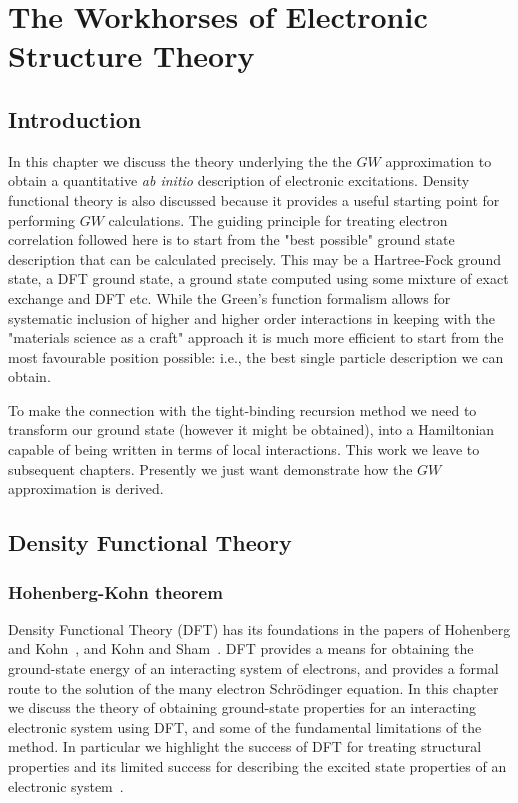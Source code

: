 \chapter{The Workhorses of Electronic Structure Theory}
\label{chap:gw}
\noindent
\section{Introduction}
In this chapter we discuss the theory underlying the 
the $GW$ approximation to obtain a quantitative {\it ab initio} 
description of electronic excitations. Density functional theory
is also discussed because it provides a useful starting point for
performing $GW$ calculations. The guiding principle for treating electron 
correlation followed here is to start from the "best possible" ground state description
that can be calculated precisely. This may be a Hartree-Fock ground state,
a DFT ground state, a ground state computed using some mixture of exact exchange
and DFT etc. While the Green's function formalism allows for systematic
inclusion of higher and higher order interactions in keeping with the "materials
science as a craft" approach it is much more efficient to start from the most 
favourable position possible: i.e., the best single particle description we can obtain.

To make the connection with the tight-binding recursion method 
we need to transform our ground state (however it might be obtained), into a
Hamiltonian capable of being written in terms of local interactions. This work
we leave to subsequent chapters. Presently we just want demonstrate how the $GW$
approximation is derived.

\section{Density Functional Theory}
\subsection{Hohenberg-Kohn theorem}

Density Functional Theory (DFT) has its foundations in the papers of Hohenberg
and Kohn~\cite{hohenbergkohn64}, and Kohn and Sham~\cite{kohnsham65}.
DFT provides a means for obtaining the ground-state energy of an
interacting system of electrons, and provides a formal
route to the solution of the many electron Schr\"odinger equation.
In this chapter we discuss the theory of obtaining ground-state 
properties for an interacting electronic system using DFT, and 
some of the fundamental limitations of the method. In 
particular we highlight the success of DFT for treating structural 
properties and its limited success for describing the excited
state properties of an electronic system~\cite{martin}.

